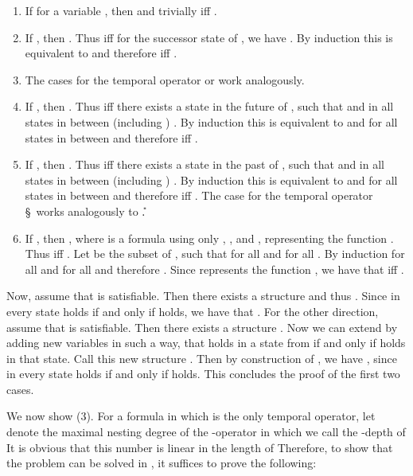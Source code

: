     \begin{enumerate}[]
    \item
      If  for a variable , then  and trivially 
      iff .
    \item
      If , then . Thus  iff for the
      successor state  of , we have . By induction this is equivalent to  and
      therefore  iff .
    \item
      The cases for the temporal operator  or  work analogously.
    \item
      If , then . Thus 
      iff there exists a state  in the future of , such that  and in all states  in between
      (including ) . By induction this is equivalent to  and for all states
      in between  and therefore  iff .
    \item  \ifreport
      If , then . Thus 
      iff there exists a state  in the past of , such that  and in all states  in between
      (including ) . By induction this is equivalent to  and for all states
      in between  and therefore  iff .
     \else The case for the temporal operator \S\ works analogously to \U. \fi
    \item
      If , then ,
      where  is a formula using only , , and , representing the function . Thus
       iff . Let  be the subset of , such that
       for all  and  for all .
      By induction  for all  and  for all
       and therefore . Since
       represents the function , we have that  iff .
    \end{enumerate}

    Now, assume that  is satisfiable. Then there exists a structure
     and thus . Since in every state  holds if and only if  holds,
    we have that . For the other direction, assume that  is satisfiable.
    Then there exists a structure . Now we can extend  by adding new variables
     in such a way, that  holds in a state  from  if and only if  holds in that state.
    Call this new structure . Then by construction of , we have , since in every state
     holds if and only if  holds.
    \ifreport
      This concludes the proof of the first two cases.

      \bigskip\noindent
    \newcommand{\xdepth}[1]{\mathtext{depth}_{\X}\!\left(#1\right)}We now show (3). For a formula  in which  is the only temporal operator, let  denote the maximal nesting degree of the -operator in  which we call the -depth of  It is obvious that this number is linear in the length of  Therefore, to show that the problem can be solved in \NP, it suffices to prove the following:

